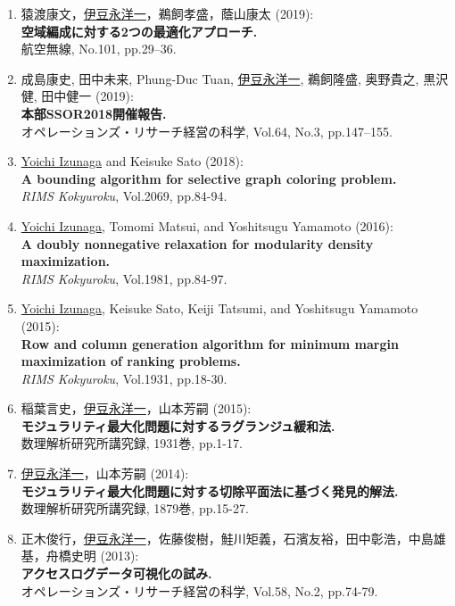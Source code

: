 \documentclass[a4j,uplatex,9pt]{jsarticle}
\begin{document}
\begin{enumerate}

\item 猿渡康文，\underline{伊豆永洋一}，鵜飼孝盛，蔭山康太 (2019):\\
{\bf 空域編成に対する2つの最適化アプローチ.}\\
{航空無線}, No.101, pp.29--36.

\item 成島康史, 田中未来, Phung-Duc Tuan, \underline{伊豆永洋一}, 鵜飼隆盛, 奥野貴之, 黒沢健, 田中健一 (2019):\\
{\bf 本部SSOR2018開催報告.}\\
{オペレーションズ・リサーチ経営の科学}, Vol.64, No.3, pp.147--155.

\item \underline{Yoichi Izunaga} and Keisuke Sato (2018):\\
{\bf A bounding algorithm for selective graph coloring problem.}\\
{\it RIMS Kokyuroku}, Vol.2069, pp.84-94.

\item \underline{Yoichi Izunaga}, Tomomi Matsui, and Yoshitsugu Yamamoto (2016):\\
{\bf A doubly nonnegative relaxation for modularity density maximization.}\\
{\it RIMS Kokyuroku}, Vol.1981, pp.84-97.

\item \underline{Yoichi Izunaga}, Keisuke Sato, Keiji Tatsumi, and Yoshitsugu Yamamoto (2015):\\
{\bf Row and column generation algorithm for minimum margin maximization of ranking problems.}\\
{\it RIMS Kokyuroku}, Vol.1931, pp.18-30.

\item 稲葉言史，\underline{伊豆永洋一}，山本芳嗣 (2015):\\
{\bf モジュラリティ最大化問題に対するラグランジュ緩和法.}\\
{数理解析研究所講究録}, 1931巻, pp.1-17.

\item \underline{伊豆永洋一}，山本芳嗣 (2014):\\
{\bf モジュラリティ最大化問題に対する切除平面法に基づく発見的解法.}\\
{数理解析研究所講究録}, 1879巻, pp.15-27.

\item 正木俊行，\underline{伊豆永洋一}，佐藤俊樹，鮭川矩義，石濱友裕，田中彰浩，中島雄基，舟橋史明 (2013):\\
{\bf アクセスログデータ可視化の試み.}\\
{オペレーションズ・リサーチ経営の科学}, Vol.58, No.2, pp.74-79.

\end{enumerate}
\end{document}
